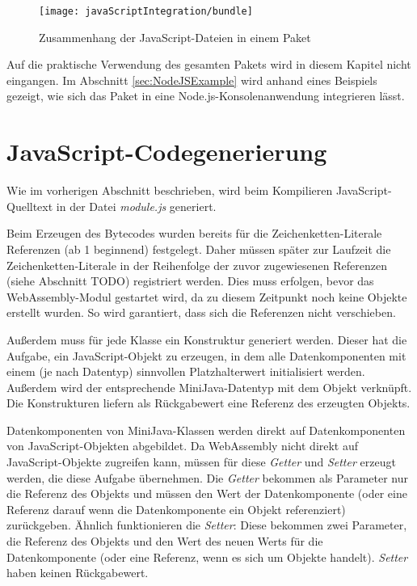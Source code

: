\begin{figure}[]
    \centering
    \texttt{[image: javaScriptIntegration/bundle]}
    \caption{Zusammenhang der JavaScript-Dateien in einem Paket}
    \label{fig:bundleStructure}
\end{figure}

Auf die praktische Verwendung des gesamten Pakets wird in diesem Kapitel nicht eingangen. Im Abschnitt \ref{sec:NodeJSExample} wird anhand eines Beispiels gezeigt, wie sich das Paket in eine Node.js-Konsolenanwendung integrieren lässt.

\section{JavaScript-Codegenerierung}
\label{sec:JavaScript-Codegenerierung}

Wie im vorherigen Abschnitt beschrieben, wird beim Kompilieren Ja\-va\-Script-Quell\-text in der Datei \emph{module.js} generiert.

Beim Erzeugen des Bytecodes wurden bereits für die Zeichenketten-Literale Referenzen (ab 1 beginnend) festgelegt. Daher müssen später zur Laufzeit die Zeichenketten-Literale in der Reihenfolge der zuvor zugewiesenen Referenzen (siehe Abschnitt TODO) registriert werden. Dies muss erfolgen, bevor das WebAssembly-Modul gestartet wird, da zu diesem Zeitpunkt noch keine Objekte erstellt wurden. So wird garantiert, dass sich die Referenzen nicht verschieben.

Außerdem muss für jede Klasse ein Konstruktur generiert werden. Dieser hat die Aufgabe, ein JavaScript-Objekt zu erzeugen, in dem alle Datenkomponenten mit einem (je nach Datentyp) sinnvollen Platzhalterwert initialisiert werden. Außerdem wird der entsprechende MiniJava-Datentyp mit dem Objekt verknüpft. Die Konstrukturen liefern als Rückgabewert eine Referenz des erzeugten Objekts.

Datenkomponenten von MiniJava-Klassen werden direkt auf Datenkomponenten von Java\-Script-Objekten abgebildet. Da WebAssembly nicht direkt auf JavaScript-Objekte zugreifen kann, müssen für diese \emph{Getter} und \emph{Setter} erzeugt werden, die diese Aufgabe übernehmen. Die \emph{Getter} bekommen als Parameter nur die Referenz des Objekts und müssen den Wert der Datenkomponente (oder eine Referenz darauf wenn die Datenkomponente ein Objekt referenziert) zurückgeben. Ähnlich funktionieren die \emph{Setter}: Diese bekommen zwei Parameter, die Referenz des Objekts und den Wert des neuen Werts für die Datenkomponente (oder eine Referenz, wenn es sich um Objekte handelt). \emph{Setter} haben keinen Rückgabewert.

